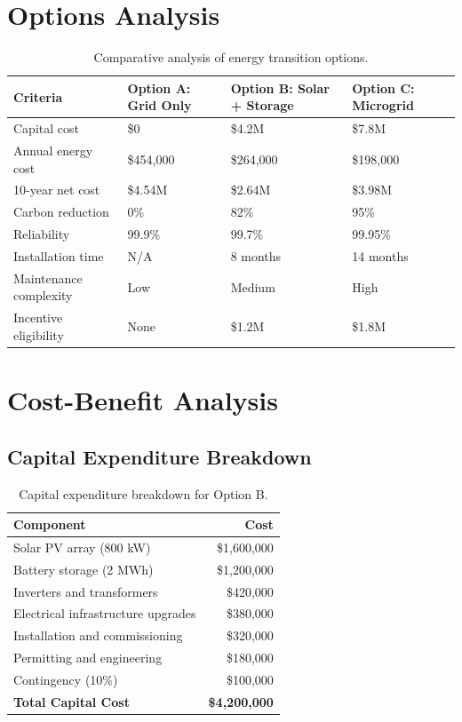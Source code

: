 \documentclass[
    language=english,
    doctype=feasibility-study,
    institution=none,
]{../../omnilatex}
\begin{document}
\section{Options Analysis}

\begin{table}[h]
    \centering
    \begin{tabular}{p{3.5cm}p{3.5cm}p{3.5cm}p{3.5cm}}
        \toprule
        \textbf{Criteria} & \textbf{Option A: Grid Only} & \textbf{Option B: Solar + Storage} & \textbf{Option C: Microgrid} \\
        \midrule
        Capital cost & \$0 & \$4.2M & \$7.8M \\
        Annual energy cost & \$454,000 & \$264,000 & \$198,000 \\
        10-year net cost & \$4.54M & \$2.64M & \$3.98M \\
        Carbon reduction & 0\% & 82\% & 95\% \\
        Reliability & 99.9\% & 99.7\% & 99.95\% \\
        Installation time & N/A & 8 months & 14 months \\
        Maintenance complexity & Low & Medium & High \\
        Incentive eligibility & None & \$1.2M & \$1.8M \\
        \bottomrule
    \end{tabular}
    \caption{Comparative analysis of energy transition options.}
\end{table}

\section{Cost-Benefit Analysis}

\subsection{Capital Expenditure Breakdown}

\begin{table}[h]
    \centering
    \begin{tabular}{lr}
        \toprule
        \textbf{Component} & \textbf{Cost} \\
        \midrule
        Solar PV array (800 kW) & \$1,600,000 \\
        Battery storage (2 MWh) & \$1,200,000 \\
        Inverters and transformers & \$420,000 \\
        Electrical infrastructure upgrades & \$380,000 \\
        Installation and commissioning & \$320,000 \\
        Permitting and engineering & \$180,000 \\
        Contingency (10\%) & \$100,000 \\
        \midrule
        \textbf{Total Capital Cost} & \textbf{\$4,200,000} \\
        \bottomrule
    \end{tabular}
    \caption{Capital expenditure breakdown for Option B.}
\end{table}
\end{document}
